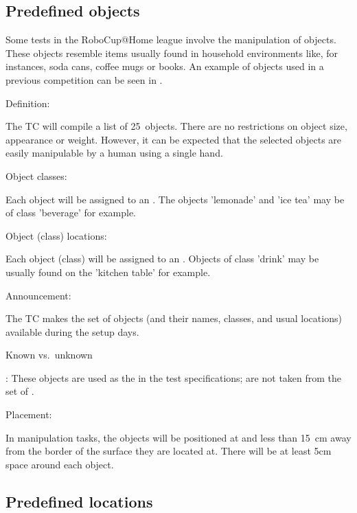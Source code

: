 \subsection{Predefined objects}\label{rule:scenario_objects}

\def\NumObjects{25\ }
\def\NumLocations{20\ }
\def\NumNames{20\ }

Some tests in the RoboCup@Home league involve the manipulation of objects. 
These objects resemble items usually found in household environments like, for instances, 
soda cans, coffee mugs or books. An example of objects used in a previous competition can be 
seen in .

\begin{enumerate}
{\bf\item Definition:} The TC will compile a list of \NumObjects objects. 
  There are no restrictions on object size, appearance or weight. %
  However, it can be expected that the selected objects are easily 
  manipulable by a human using a single hand.
{\bf\item Object classes:} Each object will be assigned to an .
  The objects 'lemonade' and 'ice tea' may be of class 'beverage' for example.
{\bf\item Object (class) locations:} Each object (class) will be assigned to an .
  Objects of class 'drink' may be usually found on the 'kitchen table' for example. 
{\bf\item Announcement:} The TC makes the set of objects (and their names, classes, and usual locations) available during the setup days.
{\bf\item Known vs.\ unknown}: These objects are used as the  in the test specifications;
   are not taken from the set of . 
{\bf\item Placement:} In manipulation tasks, 
  the objects will be positioned at  and less than \SI{15}{\centi\meter} away from the border of the surface 
  they are located at. 
  There will be at least 5cm space around each object.
\end{enumerate}



\subsection{Predefined locations}\label{rule:scenario_locations}


